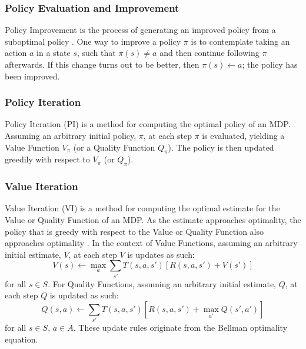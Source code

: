 \subsubsection{Policy Evaluation and Improvement}
Policy Improvement \cite{Bellman:1957} is the process of generating an improved policy from a suboptimal policy \cite{DBLP:books/lib/Bertsekas05}. One way to improve a policy $\pi$ is to contemplate taking an action $a$ in a state $s$, such that $\pi(s) \neq a$ and then continue following $\pi$ afterwards. If this change turns out to be better, then $\pi(s) \leftarrow a$; the policy has been improved.
\subsubsection{Policy Iteration}
Policy Iteration (PI) \cite{Bellman:1957, howard:dp} is a method for computing the optimal policy of an MDP. Assuming an arbitrary initial policy, $\pi$, at each step $\pi$ is evaluated, yielding a Value Function $V_\pi$ (or a Quality Function $Q_\pi$). The policy is then updated greedily with respect to $V_\pi$ (or $Q_\pi$).
\subsubsection{Value Iteration}
Value Iteration (VI) \cite{Bellman:1957} is a method for computing the optimal estimate for the Value or Quality Function of an MDP. As the estimate approaches optimality, the policy that is greedy with respect to the Value or Quality Function also approaches optimality \cite{series/synthesis/2010Szepesvari}.
In the context of Value Functions, assuming an arbitrary initial estimate, $V$, at each step $V$ is updates as such:
\begin{equation}
\label{eqn:vupdate}
V(s) \leftarrow \max_a\sum_{s'}T(s, a, s')[R(s, a, s')+V(s')]
\end{equation}
for all $s \in S$.
For Quality Functions, assuming an arbitrary initial estimate, $Q$, at each step $Q$ is updated as such:
\begin{equation}
\label{eqn:qupdate}
Q(s,a) \leftarrow \sum_{s'}T(s,a,s')[R(s,a,s') + \max_{a'}Q(s',a')]
\end{equation}
for all $s \in S$, $a \in A$. These update rules originate from the Bellman optimality equation.
